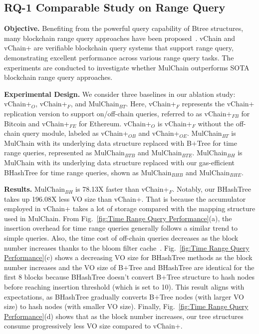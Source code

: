 \subsection{RQ-1 Comparable Study on Range Query}

\noindent
\textbf{Objective.}
Benefiting from the powerful query capability of Btree structures, many blockchain range query approaches have been proposed~\cite{xu2019vchain,wang2022vchain+}.
vChain and vChain+ are verifiable blockchain query systems that support range query, demonstrating excellent performance across various range query tasks.
The experiments are conducted to investigate whether MulChain outperforms SOTA blockchain range query approaches.


\noindent
\textbf{Experimental Design.}
We consider three baselines in our ablation study: 
vChain+$_{O}$, vChain+$_{F}$, and MulChain$_{BT}$. 
Here, vChain+$_{F}$ represents the vChain+ replication version to support on/off-chain queries, referred to as vChain+$_{FB}$ for Bitcoin and vChain+$_{FE}$ for Ethereum.
vChain+$_{O}$ is vChain+$_{F}$ without the off-chain query module, labeled as vChain+$_{OB}$ and vChain+$_{OE}$.
MulChain$_{BT}$ is MulChain with its underlying data structure replaced with B\(+\)Tree for time range queries, represented as MulChain$_{BTB}$ and MulChain$_{BTE}$.
MulChain$_{BH}$ is MulChain with its underlying data structure replaced with our gas-efficient BHashTree for time range queries, shown as MulChain$_{BHB}$ and MulChain$_{BHE}$.

\noindent
\textbf{Results.}
MulChain$_{BH}$ is 78.13X faster than vChain+$_F$. 
Notably, our BHashTree takes up 196.08X less VO size than vChain+. 
That is because the accumulator employed in vChain+ takes a lot of storage compared with the mapping structure used in MulChain. 
From Fig.~\ref{fig:Time Range Query Performance}(a), the insertion overhead for time range queries generally follows a similar trend to simple queries. 
Also, the time cost of off-chain queries decreases as the block number increases thanks to the bloom filter cache~\cite{ScalableBloomFilters2007}.
Fig.~\ref{fig:Time Range Query Performance}(c) shows a decreasing VO size for BHashTree methods as the block number increases and the VO size of B\(+\)Tree and BHashTree are identical for the first 8 blocks because BHashTree doesn't convert B\(+\)Tree structure to hash nodes before reaching insertion threshold (which is set to 10).
This result aligns with expectations, as BHashTree gradually converts B\(+\)Tree nodes (with larger VO size) to hash nodes (with smaller VO size).
Finally, Fig.~\ref{fig:Time Range Query Performance}(d) shows that as the block number increases, our tree structures consume progressively less VO size compared to vChain+.


